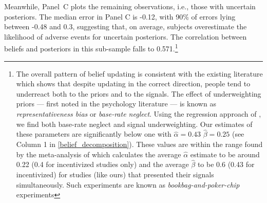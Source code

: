\documentclass[12pt,a4paper]{article}
\begin{document}
Meanwhile, Panel~C plots the remaining observations, i.e., those with uncertain posteriors. The median error in Panel C is -0.12, with 90\% of errors lying between -0.48 and 0.3, suggesting that, on average, subjects overestimate the likelihood of adverse events for uncertain posteriors. The correlation between beliefs and posteriors in this sub-sample falls to 0.571.\footnote{The overall pattern of belief updating is consistent with the existing literature which shows that despite updating in the correct direction, people tend to underreact both to the priors and to the signals. The effect of underweighting priors --- first noted in the psychology literature \citep{phillips_conservatism_1966-1, tversky_belief_1971, kahneman_subjective_1972} --- is known as \emph{representativeness bias} or \emph{base-rate neglect}. Using the regression approach of \citet{grether_bayes_1980}, we find both base-rate neglect and signal underweighting. Our estimates of these parameters are significantly below one with $\hat \alpha=0.43$ $\hat \beta=0.25$ (see Column 1 in \ref{belief_decomposition}). These values are within the range found by the meta-analysis of \citet{benjamin_chapter_2019} which calculates the average $\hat \alpha$ estimate to be around 0.22 (0.4 for incentivized studies only) and the average $\hat \beta$ to be 0.6 (0.43 for incentivized) for studies (like ours) that presented their signals simultaneously.  Such experiments are known as \emph{bookbag-and-poker-chip} experiments} 

\end{document}
